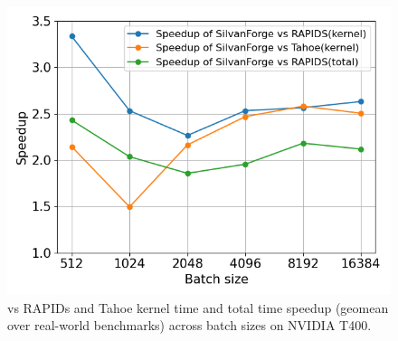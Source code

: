 
\begin{figure}[htb]
  \centering
  \includegraphics[width=0.75\linewidth]{figures/geomean_speedup_T400_kernel_time.png}
  \caption{\Treebeard{} vs RAPIDs and Tahoe kernel time and total time speedup (geomean over real-world 
  benchmarks) across batch sizes on NVIDIA T400.}
  \label{Fig:TBvsRAPIDsTahoe_T400_Speedup}
\end{figure}

